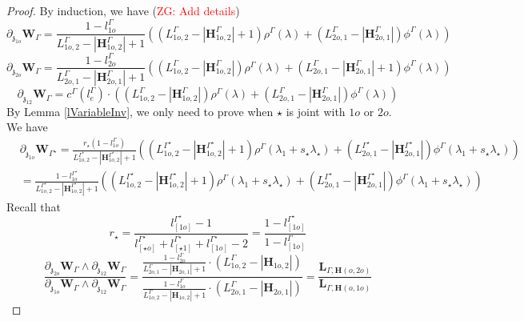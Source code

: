 \documentclass[11pt]{amsart}
\theoremstyle{definition}
\theoremstyle{remark}
\numberwithin{equation}{section}
\newcommand{\Gui}[1]{(\textcolor{red}{ZG: #1})}
\begin{document}
\begin{proof}



  By induction, we have \Gui{Add details}
$$
  \partial_{\mathfrak{z}_{1o}}\mathbf{W}_{\Gamma}=\frac{1-l^{\Gamma}_{1o}}{L^{\Gamma}_{1o,2}-|\mathbf{H}^{\Gamma}_{1o,2}|+1}\left((L^{\Gamma}_{1o,2}-|\mathbf{H}^{\Gamma}_{1o,2}|+1)\rho^{\Gamma}(\lambda)+(L^{\Gamma}_{2o,1}-|\mathbf{H}^{\Gamma}_{2o,1}|)\phi^{\Gamma}(\lambda)\right)
  $$
$$
  \partial_{\mathfrak{z}_{2o}}\mathbf{W}_{\Gamma}=\frac{1-l^{\Gamma}_{2o}}{L^{\Gamma}_{2o,1}-|\mathbf{H}^{\Gamma}_{2o,1}|+1}\left((L^{\Gamma}_{1o,2}-|\mathbf{H}^{\Gamma}_{1o,2}|)\rho^{\Gamma}(\lambda)+(L^{\Gamma}_{2o,1}-|\mathbf{H}^{\Gamma}_{2o,1}|+1)\phi^{\Gamma}(\lambda)\right)
  $$
$$
\partial_{\mathfrak{z}_{12}}\mathbf{W}_{\Gamma}=c^{\Gamma}(l_e^{\Gamma})\cdot \left((L^{\Gamma}_{1o,2}-|\mathbf{H}^{\Gamma}_{1o,2}|)\rho^{\Gamma}(\lambda)+(L^{\Gamma}_{2o,1}-|\mathbf{H}^{\Gamma}_{2o,1}|)\phi^{\Gamma}(\lambda)\right)
$$
By Lemma \ref{lVariableInv}, we only need to prove when $\star$ is joint with $1o$ or $2o$. We have
\begin{align*}
   &   \partial_{\mathfrak{z}_{1o}}\mathbf{W}_{\Gamma^{\star}}=\frac{r_{\star}(1-l^{\Gamma}_{1o})}{L^{\Gamma^{\star}}_{1o,2}-|\mathbf{H}^{\Gamma^{\star}}_{1o,2}|+1}\left((L^{\Gamma^{\star}}_{1o,2}-|\mathbf{H}^{\Gamma^{\star}}_{1o,2}|+1)\rho^{\Gamma}(\lambda_1+s_{\star}\lambda_{\star})+(L^{\Gamma^{\star}}_{2o,1}-|\mathbf{H}^{\Gamma^{\star}}_{2o,1}|)\phi^{\Gamma}(\lambda_1+s_{\star}\lambda_{\star})\right) \\
   & =\frac{1-l^{\Gamma^{\star}}_{1o}}{L^{\Gamma^{\star}}_{1o,2}-|\mathbf{H}^{\Gamma^{\star}}_{1o,2}|+1}\left((L^{\Gamma^{\star}}_{1o,2}-|\mathbf{H}^{\Gamma^{\star}}_{1o,2}|+1)\rho^{\Gamma}(\lambda_1+s_{\star}\lambda_{\star})+(L^{\Gamma^{\star}}_{2o,1}-|\mathbf{H}^{\Gamma^{\star}}_{2o,1}|)\phi^{\Gamma}(\lambda_1+s_{\star}\lambda_{\star})\right)
\end{align*}
Recall that
$$
r_{\star}=\frac{l^{\Gamma^\star}_{[ 1o]}-1}{l^{\Gamma^\star}_{[ \star o]}+l^{\Gamma^\star}_{[ \star 1]}+l^{\Gamma^\star}_{[ 1o]}-2}=\frac{1-l^{\Gamma^\star}_{[ 1o]}}{1-l^{\Gamma}_{[ 1o]}}
$$
  $$
  \frac{ \partial_{\mathfrak{z}_{2o}}\mathbf{W}_{\Gamma}\wedge  \partial_{\mathfrak{z}_{12}}\mathbf{W}_{\Gamma}}{ \partial_{\mathfrak{z}_{1o}}\mathbf{W}_{\Gamma}\wedge  \partial_{\mathfrak{z}_{12}}\mathbf{W}_{\Gamma}}=\frac{\frac{1-l^{\Gamma}_{2o}}{L^{\Gamma}_{2o,1}-|\mathbf{H}_{2o,1}|+1}\cdot(L^{\Gamma}_{1o,2}-|\mathbf{H}_{1o,2}|) }{\frac{1-l^{\Gamma}_{1o}}{L^{\Gamma}_{1o,2}-|\mathbf{H}_{1o,2}|+1}\cdot(L^{\Gamma}_{2o,1}-|\mathbf{H}_{2o,1}|) }=\frac{\mathbf{L}_{\Gamma,\mathbf{H}(o,2o)}}{\mathbf{L}_{\Gamma,\mathbf{H}(o,1o)}}
$$
\end{proof}
\end{document}
